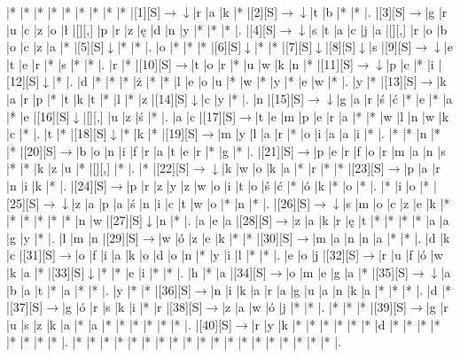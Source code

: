 \documentclass[11pt]{article}
\newcommand\drarr{$\rightarrow \!\!\!\!\! \downarrow$}
\newcommand\rarr{$\rightarrow$}
\newcommand\darr{$\downarrow$}
\begin{document}
\noindent\begin{Puzzle}{18}{25}|*	|*	|*	|*	|*	|*	|*	|*	|*	|[1][S]\drarr	|r	|a	|k	|*	|[2][S]\drarr	|t	|b	|*	|*	|.
|[3][S]\rarr	|g	|r	|u	|c	|z	|o	|ł	|[][,]{ }	|p	|r	|z	|ę	|d	|n	|y	|*	|*	|*	|.
|[4][S]\drarr	|s	|t	|a	|c	|j	|a	|[][,]{ }	|r	|o	|b	|o	|c	|z	|a	|*	|[5][S]\darr	|*	|*	|.
|o	|*	|*	|*	|[6][S]\darr	|*	|*	|[7][S]\darr	|[8][S]\darr	|s	|[9][S]\drarr	|e	|t	|e	|r	|*	|s	|*	|*	|.
|r	|*	|[10][S]\rarr	|t	|o	|r	|*	|u	|w	|k	|n	|*	|[11][S]\drarr	|p	|c	|*	|i	|[12][S]\darr	|*	|.
|d	|*	|*	|*	|ż	|*	|*	|l	|e	|o	|u	|*	|w	|*	|y	|*	|e	|w	|*	|.
|y	|*	|[13][S]\rarr	|k	|a	|r	|p	|*	|t	|k	|t	|*	|l	|*	|z	|[14][S]\darr	|c	|y	|*	|.
|n	|[15][S]\drarr	|g	|a	|r	|ś	|ć	|*	|e	|*	|a	|*	|e	|[16][S]\darr	|[][,]{ }	|u	|z	|ś	|*	|.
|a	|c	|[17][S]\rarr	|t	|e	|m	|p	|e	|r	|a	|*	|*	|w	|l	|n	|w	|k	|c	|*	|.
|t	|*	|[18][S]\darr	|*	|k	|*	|[19][S]\rarr	|m	|y	|l	|a	|r	|*	|o	|i	|a	|a	|i	|*	|.
|*	|*	|n	|*	|*	|[20][S]\rarr	|b	|o	|n	|i	|f	|r	|a	|t	|e	|r	|*	|g	|*	|.
|[21][S]\rarr	|p	|e	|r	|f	|o	|r	|m	|a	|n	|s	|*	|*	|k	|z	|u	|*	|[][,]{ }	|*	|.
|*	|[22][S]\drarr	|k	|w	|o	|k	|a	|*	|r	|*	|*	|[23][S]\rarr	|p	|a	|r	|n	|i	|k	|*	|.
|[24][S]\rarr	|p	|r	|z	|y	|z	|w	|o	|i	|t	|o	|ś	|ć	|*	|ó	|k	|*	|o	|*	|.
|*	|i	|o	|*	|[25][S]\drarr	|z	|a	|p	|a	|ś	|n	|i	|c	|t	|w	|o	|*	|n	|*	|.
|[26][S]\drarr	|s	|m	|o	|c	|z	|e	|k	|*	|*	|*	|*	|*	|*	|n	|w	|[27][S]\darr	|n	|*	|.
|a	|e	|a	|[28][S]\rarr	|z	|a	|k	|r	|ę	|t	|*	|*	|*	|*	|a	|a	|g	|y	|*	|.
|l	|m	|n	|[29][S]\rarr	|w	|ó	|z	|e	|k	|*	|*	|[30][S]\rarr	|m	|a	|n	|n	|a	|*	|*	|.
|d	|k	|c	|[31][S]\rarr	|o	|f	|i	|a	|k	|o	|d	|o	|n	|*	|y	|i	|l	|*	|*	|.
|e	|o	|j	|[32][S]\rarr	|r	|u	|f	|ó	|w	|k	|a	|*	|[33][S]\darr	|*	|*	|e	|i	|*	|*	|.
|h	|*	|a	|[34][S]\rarr	|o	|m	|e	|g	|a	|*	|[35][S]\drarr	|a	|b	|a	|t	|*	|a	|*	|*	|.
|y	|*	|*	|[36][S]\rarr	|n	|i	|k	|a	|r	|a	|g	|u	|a	|n	|k	|a	|*	|*	|*	|.
|d	|*	|[37][S]\rarr	|g	|ó	|r	|s	|k	|i	|*	|r	|[38][S]\rarr	|z	|a	|w	|ó	|j	|*	|*	|.
|*	|*	|*	|[39][S]\rarr	|g	|r	|u	|s	|z	|k	|a	|*	|a	|*	|*	|*	|*	|*	|*	|.
|[40][S]\rarr	|r	|y	|k	|*	|*	|*	|*	|*	|*	|d	|*	|*	|*	|*	|*	|*	|*	|*	|.
|*	|*	|*	|*	|*	|*	|*	|*	|*	|*	|*	|*	|*	|*	|*	|*	|*	|*	|*	|.\end{Puzzle}

\newpage
\end{document}
